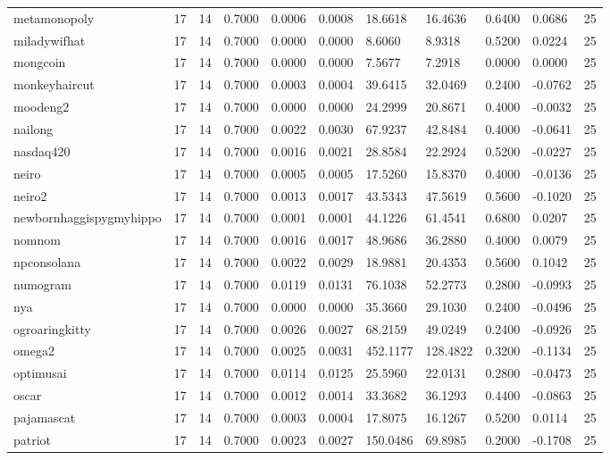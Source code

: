 \begin{table}[htbp]
\begin{tabular}{lllllllllll}
metamonopoly & 17 & 14 & 0.7000 & 0.0006 & 0.0008 & 18.6618 & 16.4636 & 0.6400 & 0.0686 & 25 \\
miladywifhat & 17 & 14 & 0.7000 & 0.0000 & 0.0000 & 8.6060 & 8.9318 & 0.5200 & 0.0224 & 25 \\
mongcoin & 17 & 14 & 0.7000 & 0.0000 & 0.0000 & 7.5677 & 7.2918 & 0.0000 & 0.0000 & 25 \\
monkeyhaircut & 17 & 14 & 0.7000 & 0.0003 & 0.0004 & 39.6415 & 32.0469 & 0.2400 & -0.0762 & 25 \\
moodeng2 & 17 & 14 & 0.7000 & 0.0000 & 0.0000 & 24.2999 & 20.8671 & 0.4000 & -0.0032 & 25 \\
nailong & 17 & 14 & 0.7000 & 0.0022 & 0.0030 & 67.9237 & 42.8484 & 0.4000 & -0.0641 & 25 \\
nasdaq420 & 17 & 14 & 0.7000 & 0.0016 & 0.0021 & 28.8584 & 22.2924 & 0.5200 & -0.0227 & 25 \\
neiro & 17 & 14 & 0.7000 & 0.0005 & 0.0005 & 17.5260 & 15.8370 & 0.4000 & -0.0136 & 25 \\
neiro2 & 17 & 14 & 0.7000 & 0.0013 & 0.0017 & 43.5343 & 47.5619 & 0.5600 & -0.1020 & 25 \\
newbornhaggispygmyhippo & 17 & 14 & 0.7000 & 0.0001 & 0.0001 & 44.1226 & 61.4541 & 0.6800 & 0.0207 & 25 \\
nomnom & 17 & 14 & 0.7000 & 0.0016 & 0.0017 & 48.9686 & 36.2880 & 0.4000 & 0.0079 & 25 \\
npconsolana & 17 & 14 & 0.7000 & 0.0022 & 0.0029 & 18.9881 & 20.4353 & 0.5600 & 0.1042 & 25 \\
numogram & 17 & 14 & 0.7000 & 0.0119 & 0.0131 & 76.1038 & 52.2773 & 0.2800 & -0.0993 & 25 \\
nya & 17 & 14 & 0.7000 & 0.0000 & 0.0000 & 35.3660 & 29.1030 & 0.2400 & -0.0496 & 25 \\
ogroaringkitty & 17 & 14 & 0.7000 & 0.0026 & 0.0027 & 68.2159 & 49.0249 & 0.2400 & -0.0926 & 25 \\
omega2 & 17 & 14 & 0.7000 & 0.0025 & 0.0031 & 452.1177 & 128.4822 & 0.3200 & -0.1134 & 25 \\
optimusai & 17 & 14 & 0.7000 & 0.0114 & 0.0125 & 25.5960 & 22.0131 & 0.2800 & -0.0473 & 25 \\
oscar & 17 & 14 & 0.7000 & 0.0012 & 0.0014 & 33.3682 & 36.1293 & 0.4400 & -0.0863 & 25 \\
pajamascat & 17 & 14 & 0.7000 & 0.0003 & 0.0004 & 17.8075 & 16.1267 & 0.5200 & 0.0114 & 25 \\
patriot & 17 & 14 & 0.7000 & 0.0023 & 0.0027 & 150.0486 & 69.8985 & 0.2000 & -0.1708 & 25 \\

\end{tabular}
\end{table}
